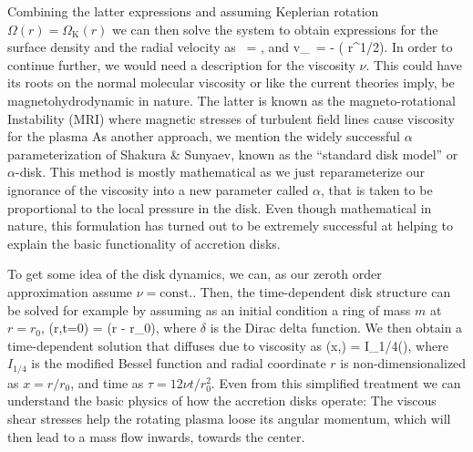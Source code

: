 Combining the latter expressions and assuming Keplerian rotation $\Omega(r) = \Omega_{\mathrm{K}}(r)$ we can then solve the system to obtain expressions for the surface density and the radial velocity as
\be
{} =  ,
\ee
and
\be
v_{} = -  ( \nu \Sigma r^{1/2}).
\ee
In order to continue further, we would need a description for the viscosity $\nu$.
This could have its roots on the normal molecular viscosity\cite{ChapmanCowling52} or like the current theories imply, be magnetohydrodynamic in nature.
The latter is known as the magneto-rotational Instability (MRI) where magnetic stresses of turbulent field lines cause viscosity for the plasma\cite{Cha60, BH91} 
As another approach, we mention the widely successful $\alpha$ parameterization of Shakura \& Sunyaev, known as the ``standard disk model'' or $\alpha$-disk.\cite{SS73}
This method is mostly mathematical as we just reparameterize our ignorance of the viscosity into a new parameter called $\alpha$, that is taken to be proportional to the local pressure in the disk.
Even though mathematical in nature, this formulation has turned out to be extremely successful at helping to explain the basic functionality of accretion disks.

To get some idea of the disk dynamics, we can, as our zeroth order approximation assume $\nu = \mathrm{const.}$.
Then, the time-dependent disk structure can be solved for example by assuming as an initial condition a ring of mass $m$ at $r=r_0$,
\be
\Sigma(r,t=0) =  \delta(r - r_0),
\ee
where $\delta$ is the Dirac delta function.
We then obtain a time-dependent solution that diffuses due to viscosity as
\be
\Sigma(x,\tau) =   \exp{} I_{1/4}\left(\right),
\ee
where $I_{1/4}$ is the modified Bessel function and radial coordinate $r$ is non-dimensionalized as $x = r/r_0$, and time as $\tau = 12 \nu t /r_0^2$.
Even from this simplified treatment we can understand the basic physics of how the accretion disks operate:
The viscous shear stresses help the rotating plasma loose its angular momentum, which will then lead to a mass flow inwards, towards the center.

